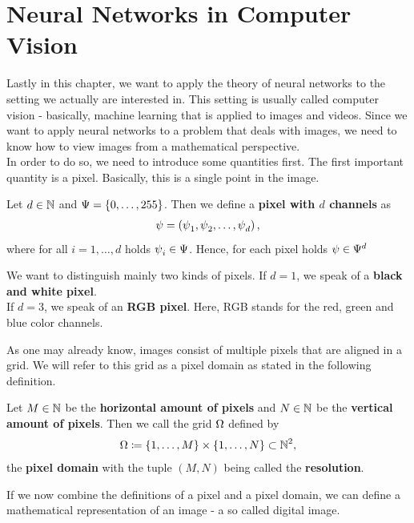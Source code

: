 \section{Neural Networks in Computer Vision}
Lastly in this chapter, we want to apply the theory of neural networks to the setting we actually are interested in. This setting is usually called computer vision - basically, machine learning that is applied to images and videos. Since we want to apply neural networks to a problem that deals with images, we need to know how to view images from a mathematical perspective.\\
In order to do so, we need to introduce some quantities first. The first important quantity is a pixel. Basically, this is a single point in the image.


\begin{definition}\label{def:pixel}
Let $d\in\N$ and $\P=\{0,\ldots,255\}$. Then we define a \textbf{pixel with $d$ channels} as
\begin{align*}
\p = \left(\p_1, \p_2,\ldots, \p_d\right),
\end{align*}
where for all $i=1,\ldots,d$ holds $\p_i\in\P$. Hence, for each pixel holds $\p\in\P^d$
\end{definition}


\begin{remark}
We want to distinguish mainly two kinds of pixels. If $d=1$, we speak of a \textbf{black and white pixel}.\\
If $d=3$, we speak of an \textbf{RGB pixel}. Here, RGB stands for the  red, green and blue color channels.
\end{remark}


As one may already know, images consist of multiple pixels that are aligned in a grid. We will refer to this grid as a pixel domain as stated in the following definition.


\begin{definition}\label{def:pixel_domain}
Let $M\in\N$ be the \textbf{horizontal amount of pixels} and $N\in\N$ be the \textbf{vertical amount of pixels}. Then we call the grid $\O$ defined by
\begin{align*}
\O \coloneqq \left\{1, \ldots, M\right\} \times \left\{1,\ldots, N\right\} \subset \N^2,
\end{align*}
the \textbf{pixel domain} with the tuple $(M,N)$ being called the \textbf{resolution}.
\end{definition}


If we now combine the definitions of a pixel and a pixel domain, we can define a mathematical representation of an image - a so called digital image.


